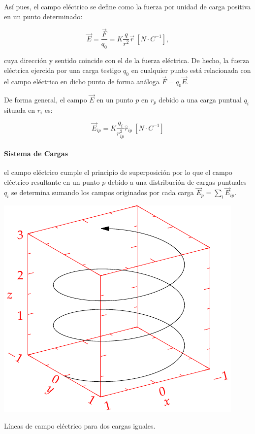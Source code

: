 \documentclass{tufte-handout}
\begin{document}
Así pues, el campo eléctrico se define como la fuerza por unidad de carga positiva en un punto determinado:

\begin{equation}
\vec{E} = \frac{\vec{F}}{q_0} = K \frac{q}{r^2}{\vec{r}}~[N\cdot C^{-1}],
\end{equation}

cuya dirección y sentido coincide con el de la fuerza eléctrica. De hecho, la fuerza eléctrica ejercida por una carga testigo $q_0$ en cualquier punto está relacionada con el campo eléctrico en dicho punto de forma análoga $\vec{F} = q_0\vec{E}$.

De forma general, el campo $\vec{E}$ en un punto $p$ en $r_p$ debido a una carga puntual $q_i$ situada en $r_i$ es:

\begin{equation}
\vec{E}_{ip} = K \frac{q_i}{r^2_{ip}}\hat{r}_{ip}~[N\cdot C^{-1}]
\end{equation}

\paragraph{Sistema de Cargas} el campo eléctrico cumple el principio de superposición por lo que el campo eléctrico resultante en un punto $p$ debido a una distribución de cargas puntuales $q_i$ se determina sumando los campos originados por cada carga $\vec{E}_p = \sum_i \vec{E}_{ip}$.

\begin{marginfigure}%
    \includegraphics[width=\linewidth]{helix}
    \caption{Líneas de campo eléctrico para dos cargas iguales.}
    \label{fig:lineascampoelectrico}
\end{marginfigure}
\end{document}
